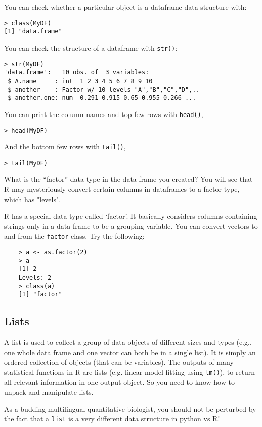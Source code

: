 You can check whether a particular object is a dataframe data structure with:
\begin{lstlisting}
> class(MyDF)
[1] "data.frame"
\end{lstlisting}
You can check the structure of a dataframe with {\tt str()}:
\begin{lstlisting}
> str(MyDF)
'data.frame':	10 obs. of  3 variables:
 $ A.name     : int  1 2 3 4 5 6 7 8 9 10
 $ another    : Factor w/ 10 levels "A","B","C","D",..
 $ another.one: num  0.291 0.915 0.65 0.955 0.266 ...
\end{lstlisting}
You can print the column names and top few rows with {\tt head()},
\begin{lstlisting}
> head(MyDF)
\end{lstlisting}

And the bottom few rows with {\tt tail()},
\begin{lstlisting}
> tail(MyDF)
\end{lstlisting}

\begin{tipbox}
	What is the ``factor'' data type in the data frame you created? You 
	will see that R may mysteriously convert certain columns in dataframes 
	to a factor type, which has "levels".  
	
	R has a special data type called `factor'. It basically considers 
	columns containing strings-only in a data frame to be a grouping 
	variable. You can convert vectors to and from the {\tt factor} class. 
	Try the following:
	
	\begin{lstlisting}
	> a <- as.factor(2)
	> a
	[1] 2
	Levels: 2
	> class(a)
	[1] "factor"
	\end{lstlisting}	
\end{tipbox}

\subsection{Lists} 

A list is used to collect a group of data objects of different sizes 
and types (e.g., one whole data frame and one vector can both be in a 
single list). It is simply an ordered collection of objects (that can 
be variables). The outputs of many statistical functions in R are lists 
(e.g. linear model fitting using {\tt lm()}), to return all relevant 
information in one output object. So you need to know how to unpack and 
manipulate lists. 

\begin{tipbox}	
As a budding multilingual quantitative biologist, you should not be 
perturbed by the fact that a {\tt list} is a very different data structure in 
python vs R!
\end{tipbox}
	
